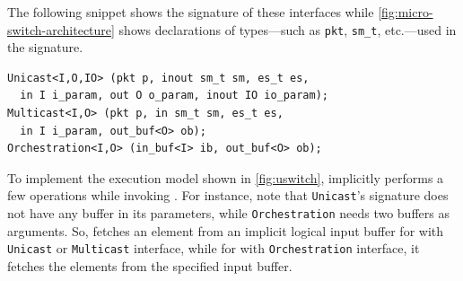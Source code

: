 \documentclass[letterpaper,twocolumn,10pt]{article}
\begin{document}
The following snippet shows the signature of these interfaces while
\cref{fig:micro-switch-architecture} shows declarations of types---such
as \texttt{pkt}, \texttt{sm\_t}, etc.---used in the signature.


\begin{lstlisting}[frame=none]
Unicast<I,O,IO> (pkt p, inout sm_t sm, es_t es, 
  in I i_param, out O o_param, inout IO io_param);
Multicast<I,O> (pkt p, in sm_t sm, es_t es, 
  in I i_param, out_buf<O> ob);
Orchestration<I,O> (in_buf<I> ib, out_buf<O> ob);
\end{lstlisting}

To implement the execution model shown in \cref{fig:uswitch}, \uswitch
implicitly performs a few operations while invoking \uprograms. For
instance, note that \texttt{Unicast}'s signature does not have any
buffer in its parameters, while \texttt{Orchestration} needs two
buffers as arguments. So, \uswitch fetches an element from an implicit
logical input buffer for \uprograms with \texttt{Unicast} or
\texttt{Multicast} interface, while for \uprograms with
\texttt{Orchestration} interface, it fetches the elements from the
specified input buffer.


\end{document}
